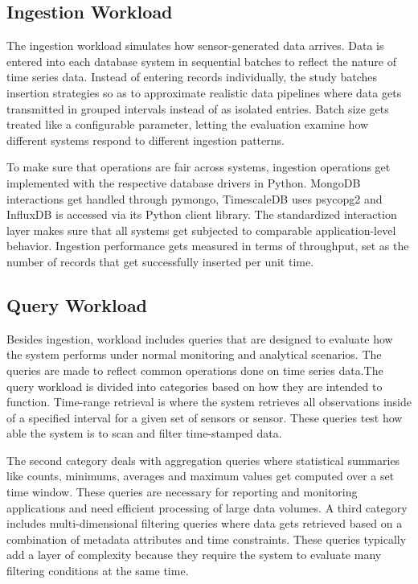 \subsection{Ingestion Workload}
The ingestion workload simulates how sensor-generated data arrives. Data is entered into each database system in sequential batches to reflect the nature of time series data. Instead of entering records individually, the study batches insertion strategies so as to approximate realistic data pipelines where data gets transmitted in grouped intervals instead of as isolated entries. Batch size gets treated like a configurable parameter, letting the evaluation examine how different systems respond to different ingestion patterns.

To make sure that operations are fair across systems, ingestion operations get implemented with the respective database drivers in Python. MongoDB interactions get handled through pymongo, TimescaleDB uses psycopg2 and InfluxDB is accessed via its Python client library. The standardized interaction layer makes sure that all systems get subjected to comparable application-level behavior. Ingestion performance gets measured in terms of throughput, set as the number of records that get successfully inserted per unit time.


\subsection{Query Workload}
Besides ingestion, workload includes queries that are designed to evaluate how the system performs under normal monitoring and analytical scenarios. The queries are made to reflect common operations done on time series data.The query workload is divided into categories based on how they are intended to function. Time-range retrieval is where the system retrieves all observations inside of a specified interval for a given set of sensors or sensor. These queries test how able the system is to scan and filter time-stamped data. 


The second category deals with aggregation queries where statistical summaries like counts, minimums, averages and maximum values get computed over a set time window. These queries are necessary for reporting and monitoring applications and need efficient processing of large data volumes. A third category includes multi-dimensional filtering queries where data gets retrieved based on a combination of metadata attributes and time constraints. These queries typically add a layer of complexity because they require the system to evaluate many filtering conditions at the same time. 

